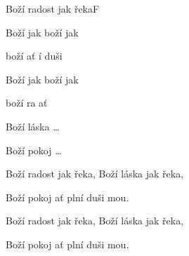 \begin{song}{Boží radost jak řeka}{F}{}
\begin{SBVerse}
Boží  jak  boží  jak 

boží  ať í duši 

Boží  jak  boží  jak 

boží ra ať   
\end{SBVerse}
\begin{SBVerse}
Boží láska \dots
\end{SBVerse}
\begin{SBVerse}
Boží pokoj \dots
\end{SBVerse}
\begin{SBVerse}
Boží radost jak řeka, Boží láska jak řeka,

Boží pokoj ať plní duši mou.

Boží radost jak řeka, Boží láska jak řeka,

Boží pokoj ať plní duši mou.
\end{SBVerse}
\end{song}
\pagebreak
